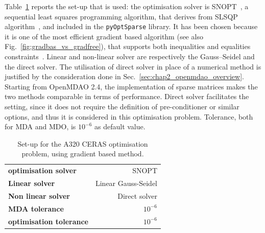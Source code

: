 Table~\ref{tab:optimisation_setup} reports the set-up that is used: the optimisation solver is SNOPT~\cite{bib:snopt}, a sequential least squares programming algorithm, that derives from SLSQP algorithm~\cite{bib:slsqp}, and included in the \texttt{pyOptSparse} library. 
It has been chosen because it is one of the most efficient gradient based algorithm (see also Fig.~\ref{fig:gradbas_vs_gradfree}), that supports both inequalities and equalities constraints~\cite{bib:snopt}. 
Linear and non-linear solver are respectively the Gauss--Seidel and the direct solver.
The utilisation of direct solver in place of a numerical method is justified by the consideration done in Sec.~\ref{sec:chap2_openmdao_overview}.
Starting from OpenMDAO 2.4, the implementation of sparse matrices makes the two methods comparable in terms of performance. 
Direct solver facilitates the setting, since it does not require the definition of pre-conditioner or similar options, and thus it is considered in this optimisation problem. 
Tolerance, both for MDA and MDO, is $10^{-6}$ as default value. 
\begin{table}[!h]
	\centering
	\begin{tabular}{l r}
		\hline
		\textbf{optimisation solver} & SNOPT \\
		\textbf{Linear solver} & Linear Gauss-Seidel \\
		\textbf{Non linear solver} & Direct solver \\
		\textbf{MDA tolerance} & $10^{-6}$ \\
		\textbf{optimisation tolerance} & $10^{-6}$ \\
		\hline
	\end{tabular}
	\caption{Set-up for the A320 CERAS optimisation problem, using gradient based method.}
	\label{tab:optimisation_setup}
\end{table}

